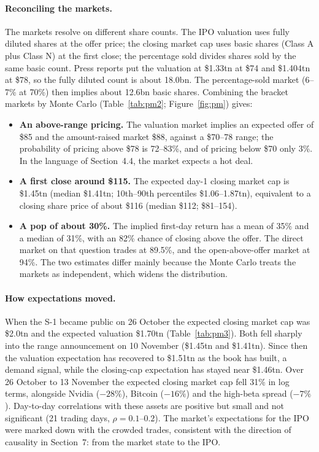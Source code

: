 \documentclass[11pt]{article}
\begin{document}
\paragraph{Reconciling the markets.} The markets resolve on different share counts. The IPO valuation uses fully diluted shares at the offer price; the closing market cap uses basic shares (Class A plus Class N) at the first close; the percentage sold divides shares sold by the same basic count. Press reports put the valuation at \$1.33tn at \$74 and \$1.404tn at \$78, so the fully diluted count is about 18.0bn. The percentage-sold market (6--7\% at 70\%) then implies about 12.6bn basic shares. Combining the bracket markets by Monte Carlo (Table~\ref{tab:pm2}; Figure~\ref{fig:pm}) gives:
\begin{itemize}
\item \textbf{An above-range pricing.} The valuation market implies an expected offer of \$85 and the amount-raised market \$88, against a \$70--78 range; the probability of pricing above \$78 is 72--83\%, and of pricing below \$70 only 3\%. In the language of Section~4.4, the market expects a hot deal.
\item \textbf{A first close around \$115.} The expected day-1 closing market cap is \$1.45tn (median \$1.41tn; 10th--90th percentiles \$1.06--1.87tn), equivalent to a closing share price of about \$116 (median \$112; \$81--154).
\item \textbf{A pop of about 30\%.} The implied first-day return has a mean of 35\% and a median of 31\%, with an 82\% chance of closing above the offer. The direct market on that question trades at 89.5\%, and the open-above-offer market at 94\%. The two estimates differ mainly because the Monte Carlo treats the markets as independent, which widens the distribution.
\end{itemize}

\paragraph{How expectations moved.} When the S-1 became public on 26 October the expected closing market cap was \$2.0tn and the expected valuation \$1.70tn (Table~\ref{tab:pm3}). Both fell sharply into the range announcement on 10 November (\$1.45tn and \$1.41tn). Since then the valuation expectation has recovered to \$1.51tn as the book has built, a demand signal, while the closing-cap expectation has stayed near \$1.46tn. Over 26 October to 13 November the expected closing market cap fell 31\% in log terms, alongside Nvidia ($-28\%$), Bitcoin ($-16\%$) and the high-beta spread ($-7\%$). Day-to-day correlations with these assets are positive but small and not significant (21 trading days, $\rho=0.1$--$0.2$). The market's expectations for the IPO were marked down with the crowded trades, consistent with the direction of causality in Section~7: from the market state to the IPO.
\end{document}
